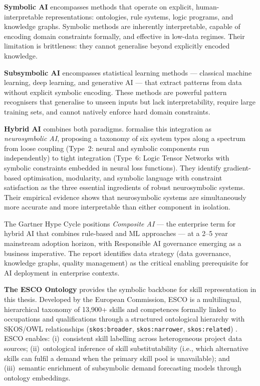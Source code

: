 \textbf{Symbolic AI} encompasses methods that operate on explicit, human-interpretable
representations: ontologies, rule systems, logic programs, and knowledge graphs. Symbolic
methods are inherently interpretable, capable of encoding domain constraints formally, and
effective in low-data regimes. Their limitation is brittleness: they cannot generalise
beyond explicitly encoded knowledge.

\textbf{Subsymbolic AI} encompasses statistical learning methods — classical machine
learning, deep learning, and generative AI — that extract patterns from data without
explicit symbolic encoding. These methods are powerful pattern recognisers that generalise
to unseen inputs but lack interpretability, require large training sets, and cannot
natively enforce hard domain constraints.

\textbf{Hybrid AI} combines both paradigms. \textcite{garcez2022neurosymbolic} formalise this
integration as \textit{neurosymbolic AI}, proposing a taxonomy of six system types along a
spectrum from loose coupling (Type~2: neural and symbolic components run independently) to
tight integration (Type~6: Logic Tensor Networks with symbolic constraints embedded in
neural loss functions). They identify gradient-based optimisation, modularity, and symbolic
language with constraint satisfaction as the three essential ingredients of robust
neurosymbolic systems. Their empirical evidence shows that neurosymbolic systems are
simultaneously more accurate and more interpretable than either component in isolation.

The Gartner Hype Cycle \parencite{gartner2024hype} positions \textit{Composite AI} — the
enterprise term for hybrid AI that combines rule-based and ML approaches — at a 2--5 year
mainstream adoption horizon, with Responsible AI governance emerging as a business
imperative. The report identifies data strategy (data governance, knowledge graphs, quality
management) as the critical enabling prerequisite for AI deployment in enterprise contexts.

\textbf{The ESCO Ontology} provides the symbolic backbone for skill representation in this
thesis. Developed by the European Commission, ESCO is a multilingual, hierarchical taxonomy
of 13{,}900+ skills and competences formally linked to occupations and qualifications through
a structured ontological hierarchy with SKOS/OWL relationships
(\texttt{skos:broader}, \texttt{skos:narrower}, \texttt{skos:related})
\parencite{le2014esco}. ESCO enables: (i)~consistent skill labelling across heterogeneous
project data sources; (ii)~ontological inference of skill substitutability
(i.e., which alternative skills can fulfil a demand when the primary skill pool is
unavailable); and (iii)~semantic enrichment of subsymbolic demand forecasting models through
ontology embeddings.

